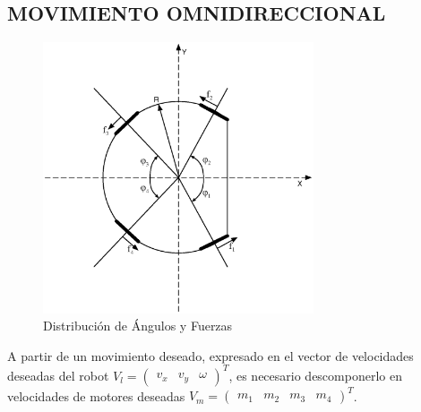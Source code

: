 \documentclass[twocolumn,10pt]{amrob}
\begin{document}
\subsection*{MOVIMIENTO OMNIDIRECCIONAL}
\begin{figure}
  \centering
    \includegraphics[width=8cm]{anglesRobot.eps}
  \caption{Distribución de Ángulos y Fuerzas}
  \label{fig:angFzaDiag}
\end{figure}
A partir de un movimiento deseado, expresado en el vector de velocidades deseadas del robot \( V_l= \begin{pmatrix} v_x & v_y & \omega \end{pmatrix}^{T} \), es necesario descomponerlo en velocidades de motores deseadas \( V_m= \begin {pmatrix} m_1 & m_2 & m_3 & m_4 \end{pmatrix}^{T} \). 
\end{document}
